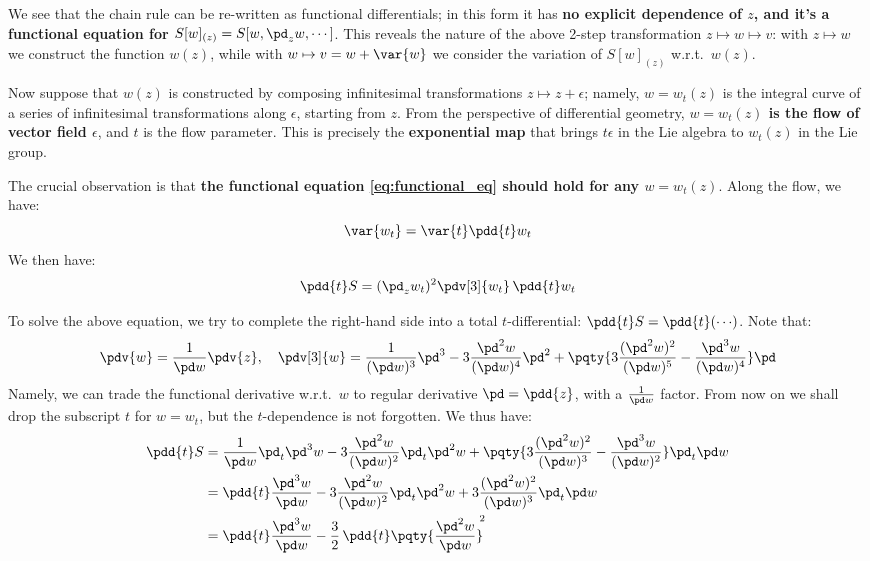 \documentclass[a4paper
	,10pt
]{article}
\begin{document}
	We see that the chain rule can be re-written as functional differentials; in this form it has \textbf{no explicit dependence of $z$, and it's a functional equation for $
		S[w]_{(z)} = S[w,\pd_z w,\cdots]
	$}. This reveals the nature of the above 2-step transformation $z\mapsto w\mapsto v$: with $z\mapsto w$ we construct the function $w(z)$, while with $w\mapsto v = w + \var{w}$ we consider the variation of $S[w]_{(z)}$ w.r.t.~$w(z)$. 
	
	\newparagraph
	Now suppose that $w(z)$ is constructed by composing infinitesimal transformations $z\mapsto z + \epsilon$; namely, $w = w_t(z)$ is the integral curve of a series of infinitesimal transformations along $\epsilon$, starting from $z$. From the perspective of differential geometry, \textbf{$w = w_t(z)$ is the flow of vector field $\epsilon$}, and $t$ is the flow parameter. This is precisely the \textbf{exponential map} that brings $t\epsilon$ in the Lie algebra to $w_t(z)$ in the Lie group. 
	
	The crucial observation is that \textbf{the functional equation \eqref{eq:functional_eq} should hold for any $w = w_t(z)$}. Along the flow, we have:
	\begin{equation}
		\var{w_t} = \var{t} \pdd{t} w_t
	\end{equation}
	We then have:
	\begin{equation}
		\pdd{t} S
		= (\pd_z w_t)^2
			\pdv[3]{w_t}\,\pdd{t} w_t
	\end{equation}
	
	To solve the above equation, we try to complete the right-hand side into a total $t$-differential: $
		\pdd{t} S = \pdd{t} ({\cdots})
	$. Note that:
	\begin{equation}
		\pdv{w} = \frac{1}{\pd w}\pdv{z},
	\quad
		\pdv[3]{w}
		= \frac{1}{(\pd w)^3} \pd^3
			- 3 \frac{\pd^2 w}{(\pd w)^4} \pd^2
			+ \pqty{
				3\frac{(\pd^2 w)^2}{(\pd w)^5}
				- \frac{\pd^3 w}{(\pd w)^4}
			} \pd
	\end{equation}
	Namely, we can trade the functional derivative w.r.t.~$w$ to regular derivative $\pd = \pdd{z}$, with a $\frac{1}{\pd w}$ factor. 
	From now on we shall drop the subscript $t$ for $w = w_t$, but the $t$-dependence is not forgotten. We thus have:
	\begin{equation}
	\begin{aligned}
		\pdd{t} S
		&= \frac{1}{\pd w}
				\pd_t \pd^3 w
			- 3 \frac{\pd^2 w}{(\pd w)^2}
				\pd_t \pd^2 w
			+ \pqty{
				3\frac{(\pd^2 w)^2}{(\pd w)^3}
				- \frac{\pd^3 w}{(\pd w)^2}
			} \pd_t \pd w \\
		&= \pdd{t} \frac{\pd^3 w}{\pd w}
			- 3 \frac{\pd^2 w}{(\pd w)^2}
				\pd_t \pd^2 w
			+ 3\frac{(\pd^2 w)^2}{(\pd w)^3}
				\pd_t \pd w \\
		&= \pdd{t} \frac{\pd^3 w}{\pd w}
			- \frac{3}{2}\,\pdd{t} 
				\pqty{\frac{\pd^2 w}{\pd w}}^{\!\!2} \\
	\end{aligned}
	\end{equation}
	
\end{document}
